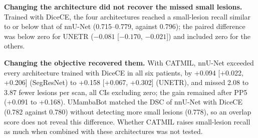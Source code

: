 \begin{table}[t]
\centering
\caption{Small-lesion detection by architecture and objective on the
MSLesSeg test set, without post-processing. All architectures are trained
with the DiceCE objective, except nnU-Net with CATMIL. Values are means
over the test scans and the five fold models; formatting as in
\cref{tab:loss_comparison_small_lesion}.}
\label{tab:arch_vs_objective}
\end{table}

\textbf{Changing the architecture did not recover the missed small
lesions.} Trained with DiceCE, the four architectures reached a
small-lesion recall similar to or below that of nnU-Net (0.715--0.779,
against 0.796); the paired difference was below zero for UNETR ($-0.081$
[$-0.170$, $-0.021$]) and included zero for the others.

\textbf{Changing the objective recovered them.} With CATMIL, nnU-Net
exceeded every architecture trained with DiceCE in all six patients, by
+0.094 [+0.022, +0.206] (SegResNet) to +0.158 [+0.067, +0.302] (UNETR), and
missed 2.08 to 3.87 fewer lesions per scan, all CIs excluding zero; the
gain remained after PP5 (+0.091 to +0.168). UMambaBot matched the DSC of
nnU-Net with DiceCE (0.782 against 0.780) without detecting more small
lesions (0.778), so an overlap score does not reveal this difference.
Whether CATMIL raises small-lesion recall as much when combined with these
architectures was not tested.


